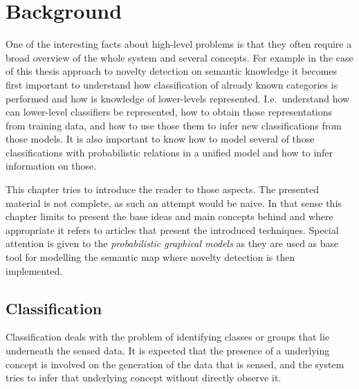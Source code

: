 \chapter{Background}\label{chap:background}
%
%
%

One of the interesting facts about high-level problems is that they often require a
broad overview of the whole system and several concepts. For example in the case of
this thesis approach to novelty detection on semantic knowledge it becomes first
important to understand how classification of already known categories is performed
and how is knowledge of lower\hyp{}levels represented. I.e.\ understand how can
lower\hyp{}level classifiers be represented, how to obtain those representations from
training data, and how to use those them to infer new classifications from those models.
It is also important to know how to model several of those classifications with
probabilistic relations in a unified model and how to infer information on those.


This chapter tries to introduce the reader to those aspects. The presented material
is not complete, as such an attempt would be naive. In that sense this chapter limits
to present the base ideas and main concepts behind and where appropriate it refers to
articles that present the introduced techniques.
Special attention is given to the \emph{probabilistic graphical models} as they are used
as base tool for modelling the semantic map where novelty detection is then implemented.


\section{Classification}
Classification deals with the problem of identifying classes or groups that lie underneath
the sensed data. It is expected that the presence of a underlying concept is involved on the
generation of the data that is sensed, and the system tries to infer that underlying concept
without directly observe it.

